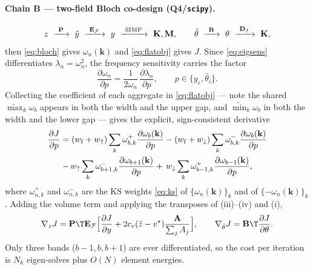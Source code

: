 \documentclass[11pt]{article}
\begin{document}
\paragraph{Chain B --- two-field Bloch co-design (Q4/\texttt{scipy}).}
\begin{equation}
  z\ \xrightarrow{\ \mathbf P\ }\ \tilde y
   \ \xrightarrow{\ \mathbf E_{\mathcal F}\ }\ y
   \ \xrightarrow{\ \rm SIMP\ }\ \mathbf K,\mathbf M,
  \qquad
  \hat\theta\ \xrightarrow{\ \mathbf B\ }\ \theta
   \ \xrightarrow{\ \mathbf D_f\ }\ \mathbf K ,
\end{equation}
then \eqref{eq:bloch} gives $\omega_n(\mathbf k)$ and \eqref{eq:flatobj} gives $J$.
Since \eqref{eq:eigsens} differentiates $\lambda_n=\omega_n^2$, the frequency
sensitivity carries the factor
\begin{equation}
  \frac{\partial\omega_n}{\partial p}=\frac{1}{2\omega_n}\,
  \frac{\partial\lambda_n}{\partial p},\qquad p\in\{y_e,\hat\theta_i\}.
\end{equation}
Collecting the coefficient of each aggregate in \eqref{eq:flatobj} --- note the
shared $\widetilde{\max}_k\omega_b$ appears in both the width and the upper gap,
and $\widetilde{\min}_k\omega_b$ in both the width and the lower gap --- gives the
explicit, sign-consistent derivative
\begin{multline}
  \frac{\partial J}{\partial p}
  =(w_{\rm f}+w_{\uparrow})\sum_k\omega^{+}_{b,k}
    \frac{\partial\omega_b(\mathbf k)}{\partial p}
  -(w_{\rm f}+w_{\downarrow})\sum_k\omega^{-}_{b,k}
    \frac{\partial\omega_b(\mathbf k)}{\partial p}\\
  -\,w_{\uparrow}\sum_k\omega^{-}_{b+1,k}
    \frac{\partial\omega_{b+1}(\mathbf k)}{\partial p}
  +\,w_{\downarrow}\sum_k\omega^{+}_{b-1,k}
    \frac{\partial\omega_{b-1}(\mathbf k)}{\partial p},
  \label{eq:chainB}
\end{multline}
where $\omega^{+}_{n,k}$ and $\omega^{-}_{n,k}$ are the KS weights \eqref{eq:ks} of
$\{\omega_n(\mathbf k)\}_k$ and of $\{-\omega_n(\mathbf k)\}_k$. Adding the volume
term and applying the transposes of (iii)--(iv) and (i),
\begin{equation}
  \nabla_z J=\mathbf P\T\mathbf E_{\mathcal F}
  \Bigl[\frac{\partial J}{\partial y}
  +2c_v(\bar z-v^\star)\frac{\mathbf A}{\textstyle\sum_j A_j}\Bigr],
  \qquad
  \nabla_{\hat\theta}J=\mathbf B\T\frac{\partial J}{\partial\theta}.
  \label{eq:chainBfull}
\end{equation}
Only three bands ($b-1,b,b+1$) are ever differentiated, so the cost per iteration
is $N_k$ eigen-solves plus $O(N)$ element energies.
\end{document}
